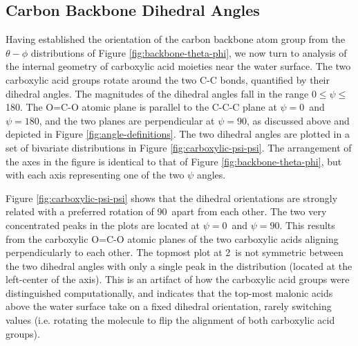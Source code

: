 \subsection {Carbon Backbone Dihedral Angles}

Having established the orientation of the carbon backbone atom group from the $\theta-\phi$ distributions of Figure \ref{fig:backbone-theta-phi}, we now turn to analysis of the  internal geometry of carboxylic acid moieties near the water surface. The two carboxylic acid groups rotate around the two C-C bonds, quantified by their dihedral angles. The magnitudes of the dihedral angles fall in the range 0\textdegree$\le \psi \le$180\textdegree. The O=C-O atomic plane is parallel to the C-C-C plane at $\psi=0$\textdegree~and $\psi=180$\textdegree, and the two planes are perpendicular at $\psi=90$\textdegree, as discussed above and depicted in Figure \ref{fig:angle-definitions}. The two dihedral angles are plotted in a set of bivariate distributions in Figure \ref{fig:carboxylic-psi-psi}. The arrangement of the axes in the figure is identical to that of Figure \ref{fig:backbone-theta-phi}, but with each axis representing one of the two $\psi$ angles.

Figure \ref{fig:carboxylic-psi-psi} shows that the dihedral orientations are strongly related with a preferred rotation of 90\textdegree~apart from each other. The two very concentrated peaks in the plots are located at $\psi=0$\textdegree~and $\psi=90$\textdegree. This results from the carboxylic O=C-O atomic planes of the two carboxylic acids aligning perpendicularly to each other. The topmost plot at 2\angs~is not symmetric between the two dihedral angles with only a single peak in the distribution (located at the left-center of the axis). This is an artifact of how the carboxylic acid groups were distinguished computationally, and indicates that the top-most malonic acids above the water surface take on a fixed dihedral orientation, rarely switching values (i.e. rotating the molecule to flip the alignment of both carboxylic acid groups).



